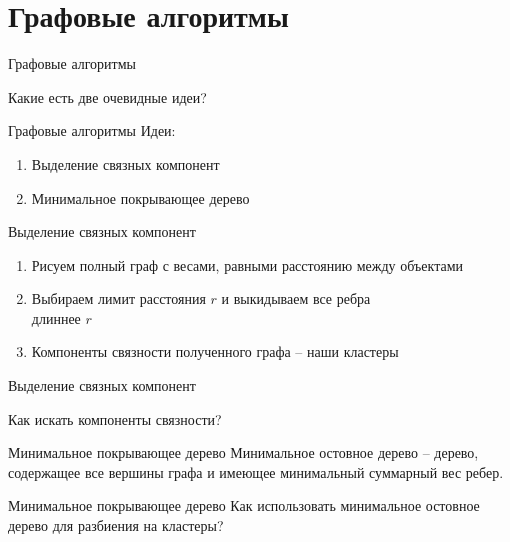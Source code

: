 \documentclass[10pt]{beamer}
\begin{document}
\section{Графовые алгоритмы}

\begin{frame}{Графовые алгоритмы}
  \begin{center}
    Какие есть две очевидные идеи?
  \end{center}    
\end{frame}

\begin{frame}{Графовые алгоритмы}
	Идеи:\\
	\begin{enumerate}
		\item Выделение связных компонент
		\item Минимальное покрывающее дерево
	\end{enumerate}
\end{frame}

\begin{frame}{Выделение связных компонент}
	\begin{enumerate}
		\item Рисуем полный граф с весами, равными расстоянию между объектами
		\item Выбираем лимит расстояния $r$ и выкидываем все ребра\\ длиннее $r$
		\item Компоненты связности полученного графа -- наши кластеры
	\end{enumerate}
\end{frame}

\begin{frame}{Выделение связных компонент}
  \begin{center}
    Как искать \alert{компоненты связности}?
  \end{center}
\end{frame}

\begin{frame}{Минимальное покрывающее дерево}
	Минимальное остовное дерево -- дерево, содержащее все вершины графа и имеющее минимальный суммарный вес ребер.\\
\end{frame}

\begin{frame}{Минимальное покрывающее дерево}
  Как использовать минимальное остовное дерево для разбиения на кластеры?
\end{frame}
\end{document}
